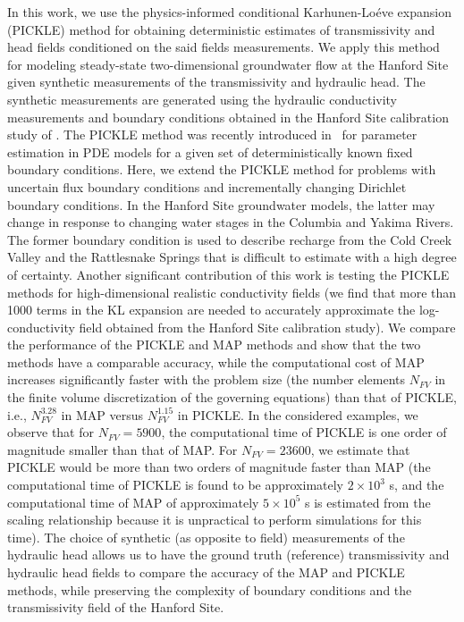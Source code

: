 \documentclass{agujournal2019}
\begin{document}
In this work, we use the physics-informed conditional Karhunen-Lo\'{e}ve expansion (PICKLE) method for obtaining deterministic estimates of transmissivity and head fields conditioned on the said fields measurements. We apply this method for modeling steady-state two-dimensional groundwater flow at the Hanford Site given synthetic measurements of the transmissivity and hydraulic head. The synthetic measurements are generated using the hydraulic conductivity measurements and boundary conditions obtained in the Hanford Site calibration study of \cite{cole2001transient}. 
The PICKLE method was recently introduced in~\cite{barajassolano-2019-pickle} for parameter estimation in PDE models for a given set of  deterministically known fixed boundary conditions.
Here, we extend the PICKLE method for problems with uncertain flux boundary conditions and incrementally changing Dirichlet boundary conditions.
In the  Hanford Site groundwater models,  the latter may change in response to changing water stages in the Columbia and Yakima Rivers.
The former boundary condition is used to describe recharge from the Cold Creek Valley and the Rattlesnake Springs that is difficult to estimate with a high degree of certainty.
Another significant contribution of this work is testing the PICKLE methods for high-dimensional realistic conductivity fields (we find that more than 1000 terms in the KL expansion are needed to accurately approximate the log-conductivity field obtained from the Hanford Site calibration study). 
We compare the performance of the PICKLE and MAP methods  and show that the two methods have a comparable accuracy, while the computational cost of MAP increases significantly faster with the problem size (the number elements $N_{FV}$ in the finite volume discretization of the governing equations) than that of PICKLE, i.e., $N_{FV}^{3.28}$ in MAP versus $N_{FV}^{1.15}$ in PICKLE. In the considered examples, we observe that for $N_{FV}=5900$, the computational time of PICKLE is one order of magnitude smaller than that of MAP. For $N_{FV}=23600$, we estimate that PICKLE would be more than two orders of magnitude faster than MAP (the computational time of PICKLE is found to be approximately $2\times 10^3$ s, and the computational time of MAP of approximately $5 \times 10^5$ s is estimated from the scaling relationship because it is unpractical to perform simulations for this time). 
The choice of synthetic (as opposite to field) measurements of the hydraulic head allows us to have the ground truth (reference) transmissivity and hydraulic head fields to compare the accuracy of the MAP and PICKLE methods, while preserving the complexity of boundary conditions and the transmissivity field of the Hanford Site.     
\end{document}

